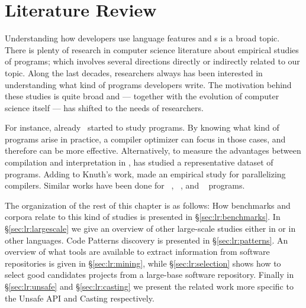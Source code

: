 



\chapter{Literature Review}
\label{cha:literature-review}

Understanding how developers use language features and \api{}s is a broad topic.
There is plenty of research in computer science literature about empirical studies of programs;
which involves several directions directly or indirectly related to our topic.
Along the last decades, researchers always has been interested in understanding what kind of programs developers write.
The motivation behind these studies is quite broad and --- together with the evolution of computer science itself --- has
shifted to the needs of researchers.

For instance, already~\cite{knuthEmpiricalStudyFORTRAN1971} started to study \fortran{} programs.
By knowing what kind of programs arise in practice, a compiler optimizer can focus in those cases, and therefore can be more effective.
Alternatively, to measure the advantages between compilation and interpretation in \basic{}, \cite{hammondBASICEvaluationProcessing1977} has studied a representative dataset of programs.
Adding to Knuth's work, \cite{shenEmpiricalStudyFortran1990} made an empirical study for parallelizing compilers.
Similar works have been done for \cobol{}~\cite{salvadoriStaticProfileCOBOL1975,chevanceStaticProfileDynamic1978}, \pascal{}~\cite{cookContextualAnalysisPascal1982}, and \apl{}~\cite{saalPropertiesAPLPrograms1975,saalEmpiricalStudyAPL1977} programs. 

The organization of the rest of this chapter is as follows: 
How benchmarks and corpora relate to this kind of studies is presented in \S\ref{sec:lr:benchmarks}.
In \S\ref{sec:lr:largescale} we give an overview of other large-scale studies either in \java{} or in other languages.
Code Patterns discovery is presented in \S\ref{sec:lr:patterns}.
An overview of what tools are available to extract information from software repositories is given in \S\ref{sec:lr:mining},
while \S\ref{sec:lr:selection} shows how to select good candidates projects from a large-base software repository.
Finally in \S\ref{sec:lr:unsafe} and \S\ref{sec:lr:casting} we present the related work more specific to the Unsafe API and Casting respectively.

